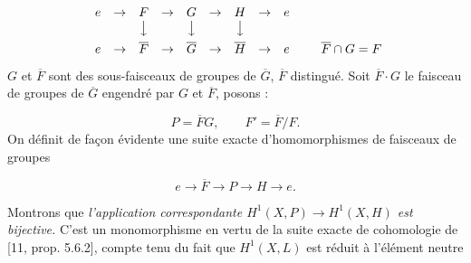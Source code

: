 \[
\begin{array}[b]{ccccccccc}
e&\to&F&\to&G&\to&H&\to&e\\
&&\big\downarrow&&\big\downarrow&&\big\downarrow&&\\[0.45em]
e&\to&\overline F&\to&\overline G&\to
&\overline H&\to&e
\end{array}
\qquad \overline F\cap G=F
\]
$G$ et $\overline F$ sont des sous-faisceaux de groupes de $\overline G$,
$\overline F$ distingué. Soit $\overline F\mathbin{\cdot}G$ le faisceau de
groupes de $\overline G$ engendré par $G$ et $\overline F$, posons :

\[
P=\overline F G,\qquad F'=\overline F/F.
\]
On définit de façon évidente une suite exacte d'homomorphismes de faisceaux de
groupes

\[
e\to\overline F\to P\to H
\to e.
\]

Montrons que \textit{l'application correspondante
$H^1(X,P)\to H^1(X,H)$ est bijective.} C'est un monomorphisme en
vertu de la suite exacte de cohomologie de [11, prop. 5.6.2], compte tenu du
fait que $H^1(X,L)$ est réduit à l'élément neutre

